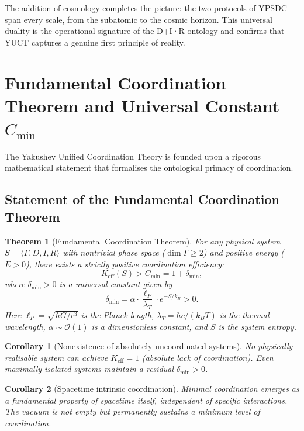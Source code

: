 \documentclass[11pt,a4paper]{article}
\newtheorem{theorem}{Theorem}
\newtheorem{corollary}{Corollary}
\begin{document}
\noindent
The addition of cosmology completes the picture: the two protocols of
YPSDC span every scale, from the subatomic to the cosmic horizon. This
universal duality is the operational signature of the D+I·R ontology and
confirms that YUCT captures a genuine first principle of reality.

\section{Fundamental Coordination Theorem and Universal Constant \texorpdfstring{$C_{\min}$}{C\_min}}
\label{sec:fundamental-theorem}

The Yakushev Unified Coordination Theory is founded upon a rigorous
mathematical statement that formalises the ontological primacy of
coordination.

\subsection{Statement of the Fundamental Coordination Theorem}

\begin{theorem}[Fundamental Coordination Theorem]
	For any physical system \(S = \langle \Gamma, D, I, R \rangle\) with
	nontrivial phase space (\(\dim\Gamma \geq 2\)) and positive energy
	(\(E > 0\)), there exists a strictly positive coordination efficiency:
	\begin{equation}
		\boxed{K_{\mathrm{eff}}(S) > C_{\min} = 1 + \delta_{\min}},
	\end{equation}
	where \(\delta_{\min} > 0\) is a universal constant given by
	\begin{equation}
		\delta_{\min} = \alpha \cdot \frac{\ell_P}{\lambda_T} \cdot e^{-S/k_B} > 0.
		\label{eq:delta-min}
	\end{equation}
	Here \(\ell_P = \sqrt{\hbar G / c^3}\) is the Planck length,
	\(\lambda_T = \hbar c / (k_B T)\) is the thermal wavelength,
	\(\alpha \sim \mathcal{O}(1)\) is a dimensionless constant, and
	\(S\) is the system entropy.
\end{theorem}

\begin{corollary}[Nonexistence of absolutely uncoordinated systems]
	No physically realisable system can achieve \(K_{\mathrm{eff}} = 1\)
	(absolute lack of coordination). Even maximally isolated systems
	maintain a residual \(\delta_{\min} > 0\).
\end{corollary}

\begin{corollary}[Spacetime intrinsic coordination]
	Minimal coordination emerges as a fundamental property of spacetime
	itself, independent of specific interactions. The vacuum is not empty
	but permanently sustains a minimum level of coordination.
\end{corollary}
\end{document}
